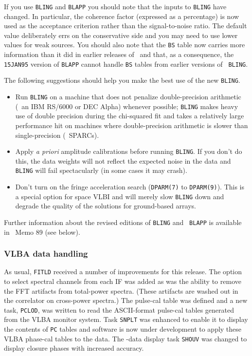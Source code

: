 If you use {\tt BLING} and {\tt BLAPP} you should note that the inputs
to {\tt BLING} have changed.  In particular, the coherence factor
(expressed as a percentage) is now used as the acceptance criterion
rather than the signal-to-noise ratio.  The default value deliberately
errs on the conservative side and you may need to use lower values for
weak sources.  You should also note that the {\tt BS} table now
carries more information than it did in earlier releases of \AIPS\ and
that, as a consequence, the {\tt 15JAN95} version of {\tt BLAPP}
cannot handle {\tt BS} tables from earlier versions of \hbox{{\tt
BLING}}.

The following suggestions should help you make the best use of the new
\hbox{{\tt BLING}}.
\vspace{-10pt}
\begin{itemize}
\item Run {\tt BLING} on a machine that does not penalize
  double-precision arithmetic (\eg\ an IBM RS/6000 or DEC Alpha)
  whenever possible; {\tt BLING} makes heavy use of double precision
  during the chi-squared fit and takes a relatively large performance
  hit on machines where double-precision arithmetic is slower than
  single-precision (\eg\ SPARCs).
\item Apply {\it a priori} amplitude calibrations before running
  \hbox{{\tt BLING}}.  If you   don't do this, the data weights will
  not reflect the expected noise in the data and {\tt BLING} will fail
  spectacularly (in some cases it may crash).
\item Don't turn on the fringe acceleration search ({\tt DPARM(7)} to
  {\tt DPARM(9)}).  This is a special option for space VLBI and will
  merely slow {\tt BLING} down and degrade the quality of the
  solutions for ground-based arrays.
\end{itemize}
\vspace{-10pt}
Further information about the revised editions of {\tt BLING} and {\tt
BLAPP} is available in \AIPS\ Memo 89 (see below).

\subsubsection{VLBA data handling}

As usual, {\tt FITLD} received a number of improvements for this
release.  The option to select spectral channels from each IF was
added as was the ability to remove the FFT artifacts from total-power
spectra.  (These artifacts are washed out in the correlator on
cross-power spectra.)  The pulse-cal table was defined and a new task,
{\tt PCLOD}, was written to read the ASCII-format pulse-cal tables
generated from the VLBA monitor system.  Task {\tt SNPLT} was enhanced
to enable it to display the contents of {\tt PC} tables and software
is now under development to apply these VLBA phase-cal tables to the
data.  The \uv-data display task {\tt SHOUV} was changed to display
closure phases with increased accuracy.

